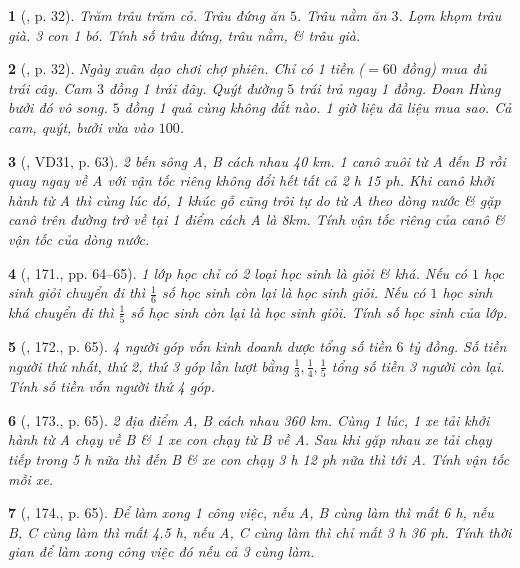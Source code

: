 \documentclass{article}
\newtheorem{baitoan}{}
\begin{document}
\begin{baitoan}[\cite{Binh_boi_duong_Toan_9_tap_2}, p. 32]
	Trăm trâu trăm cỏ. Trâu đứng ăn $5$. Trâu nằm ăn $3$. Lọm khọm trâu già. 3 con 1 bó. Tính số trâu đứng, trâu nằm, \& trâu già.
\end{baitoan}

\begin{baitoan}[\cite{Binh_boi_duong_Toan_9_tap_2}, p. 32]
	Ngày xuân dạo chơi chợ phiên. Chỉ có 1 tiền ($= 60$ đồng) mua đủ trái cây. Cam $3$ đồng 1 trái đây. Quýt đường $5$ trái trả ngay 1 đồng. Đoan Hùng bưởi đó vô song. $5$ đồng 1 quả cùng không đắt nào. 1 giờ liệu đã liệu mua sao. Cả cam, quýt, bưởi vừa vào $100$.
\end{baitoan}

\begin{baitoan}[\cite{Tuyen_Toan_9_old}, VD31, p. 63]
	2 bến sông A, B cách nhau {\rm40 km}. 1 canô xuôi từ A đến B rồi quay ngay về A với vận tốc riêng không đổi hết tất cả {\rm2 h 15 ph}. Khi canô khởi hành từ A thì cùng lúc đó, 1 khúc gỗ cũng trôi tự do từ A theo dòng nước \& gặp canô trên đường trở về tại 1 điểm cách A là {\rm 8km}. Tính vận tốc riêng của canô \& vận tốc của dòng nước.
\end{baitoan}

\begin{baitoan}[\cite{Tuyen_Toan_9_old}, 171., pp. 64--65]
	1 lớp học chỉ có 2 loại học sinh là giỏi \& khá. Nếu có $1$ học sinh giỏi chuyển đi thì $\frac{1}{6}$ số học sinh còn lại là học sinh giỏi. Nếu có $1$ học sinh khá chuyển đi thì $\frac{1}{5}$ số học sinh còn lại là học sinh giỏi. Tính số học sinh của lớp.
\end{baitoan}

\begin{baitoan}[\cite{Tuyen_Toan_9_old}, 172., p. 65]
	4 người góp vốn kinh doanh dược tổng số tiền $6$ tỷ đồng. Số tiền người thứ nhất, thứ 2, thứ 3 góp lần lượt bằng $\frac{1}{3},\frac{1}{4},\frac{1}{5}$ tổng số tiền 3 người còn lại. Tính số tiền vốn người thứ 4 góp.
\end{baitoan}

\begin{baitoan}[\cite{Tuyen_Toan_9_old}, 173., p. 65]
	2 địa điểm A, B cách nhau {\rm360 km}. Cùng 1 lúc, 1 xe tải khởi hành từ A chạy về B \& 1 xe con chạy từ B về A. Sau khi gặp nhau xe tải chạy tiếp trong {\rm5 h} nữa thì đến B \& xe con chạy {\rm3 h 12 ph} nữa thì tới A. Tính vận tốc mỗi xe.
\end{baitoan}

\begin{baitoan}[\cite{Tuyen_Toan_9_old}, 174., p. 65]
	Để làm xong 1 công việc, nếu A, B cùng làm thì mất {\rm6 h}, nếu B, C cùng làm thì mất {\rm4.5 h}, nếu A, C cùng làm thì chỉ mất {\rm3 h 36 ph}. Tính thời gian để làm xong công việc đó nếu cả 3 cùng làm.
\end{baitoan}
\end{document}
